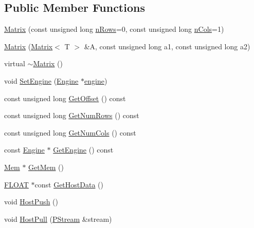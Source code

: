 \subsection*{Public Member Functions}
\begin{DoxyCompactItemize}
\item 
\hyperlink{classfractal_1_1Matrix_a227540039b2776f434cfdf84d3f47b49}{Matrix} (const unsigned long \hyperlink{classfractal_1_1Matrix_a1f328cc516cc0090940aaef4c1511616}{n\+Rows}=0, const unsigned long \hyperlink{classfractal_1_1Matrix_a6098a4de6b5fd299195916b99d7f3046}{n\+Cols}=1)
\item 
\hyperlink{classfractal_1_1Matrix_a30a6e15e354bdc6594e5f5fb62c2750d}{Matrix} (\hyperlink{classfractal_1_1Matrix}{Matrix}$<$ T $>$ \&A, const unsigned long a1, const unsigned long a2)
\item 
virtual \hyperlink{classfractal_1_1Matrix_a00462379475da0740d8b449450f4b796}{$\sim$\+Matrix} ()
\item 
void \hyperlink{classfractal_1_1Matrix_aa0ac62abd619f153baae9980b7731164}{Set\+Engine} (\hyperlink{classfractal_1_1Engine}{Engine} $\ast$\hyperlink{classfractal_1_1Matrix_a8cd6330ad7742ba28aca98d2a6be185d}{engine})
\item 
const unsigned long \hyperlink{classfractal_1_1Matrix_ad88d611ddf1f811d189229a80904b607}{Get\+Offset} () const 
\item 
const unsigned long \hyperlink{classfractal_1_1Matrix_ab2b62fd6991c32429b80c5e8d7b1b7d3}{Get\+Num\+Rows} () const 
\item 
const unsigned long \hyperlink{classfractal_1_1Matrix_a1877f1a0488da6737672fde4a1612718}{Get\+Num\+Cols} () const 
\item 
const \hyperlink{classfractal_1_1Engine}{Engine} $\ast$ \hyperlink{classfractal_1_1Matrix_a93c7ba34d553149900a652dcc8ece6c0}{Get\+Engine} () const 
\item 
\hyperlink{classfractal_1_1Mem}{Mem} $\ast$ \hyperlink{classfractal_1_1Matrix_a09197b1241a2a0dab1454beca8c0e759}{Get\+Mem} ()
\item 
\hyperlink{namespacefractal_a1c2d2530689575d5ccb56bae52af70d3}{F\+L\+O\+A\+T} $\ast$const \hyperlink{classfractal_1_1Matrix_a30d2a69f1bbb44f10f430e56481b818c}{Get\+Host\+Data} ()
\item 
void \hyperlink{classfractal_1_1Matrix_af69ce9268ef1aad1bd2bbef2d3bce66c}{Host\+Push} ()
\item 
void \hyperlink{classfractal_1_1Matrix_a57b3a183709d354fc83020a8ef87d1b2}{Host\+Pull} (\hyperlink{classfractal_1_1PStream}{P\+Stream} \&stream)

\end{DoxyCompactItemize}
